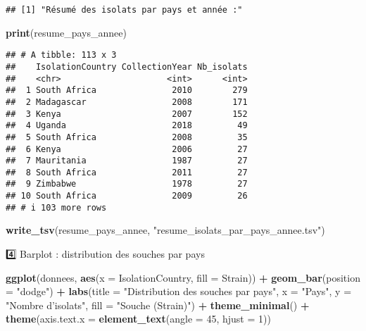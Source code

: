 \documentclass[
]{article}
\newenvironment{Shaded}{\begin{snugshade}}{\end{snugshade}}
\newcommand{\AttributeTok}[1]{\textcolor[rgb]{0.13,0.29,0.53}{#1}}
\newcommand{\DecValTok}[1]{\textcolor[rgb]{0.00,0.00,0.81}{#1}}
\newcommand{\FunctionTok}[1]{\textcolor[rgb]{0.13,0.29,0.53}{\textbf{#1}}}
\newcommand{\NormalTok}[1]{#1}
\newcommand{\SpecialCharTok}[1]{\textcolor[rgb]{0.81,0.36,0.00}{\textbf{#1}}}
\newcommand{\StringTok}[1]{\textcolor[rgb]{0.31,0.60,0.02}{#1}}
\begin{document}
\begin{verbatim}
## [1] "Résumé des isolats par pays et année :"
\end{verbatim}

\begin{Shaded}
\begin{Highlighting}[]
\FunctionTok{print}\NormalTok{(resume\_pays\_annee)}
\end{Highlighting}
\end{Shaded}

\begin{verbatim}
## # A tibble: 113 x 3
##    IsolationCountry CollectionYear Nb_isolats
##    <chr>                     <int>      <int>
##  1 South Africa               2010        279
##  2 Madagascar                 2008        171
##  3 Kenya                      2007        152
##  4 Uganda                     2018         49
##  5 South Africa               2008         35
##  6 Kenya                      2006         27
##  7 Mauritania                 1987         27
##  8 South Africa               2011         27
##  9 Zimbabwe                   1978         27
## 10 South Africa               2009         26
## # i 103 more rows
\end{verbatim}

\begin{Shaded}
\begin{Highlighting}[]
\FunctionTok{write\_tsv}\NormalTok{(resume\_pays\_annee, }\StringTok{"resume\_isolats\_par\_pays\_annee.tsv"}\NormalTok{)}
\end{Highlighting}
\end{Shaded}

4️⃣ Barplot : distribution des souches par pays

\begin{Shaded}
\begin{Highlighting}[]
\FunctionTok{ggplot}\NormalTok{(donnees, }\FunctionTok{aes}\NormalTok{(}\AttributeTok{x =}\NormalTok{ IsolationCountry, }\AttributeTok{fill =}\NormalTok{ Strain)) }\SpecialCharTok{+}
  \FunctionTok{geom\_bar}\NormalTok{(}\AttributeTok{position =} \StringTok{"dodge"}\NormalTok{) }\SpecialCharTok{+}
  \FunctionTok{labs}\NormalTok{(}\AttributeTok{title =} \StringTok{"Distribution des souches par pays"}\NormalTok{,}
       \AttributeTok{x =} \StringTok{"Pays"}\NormalTok{,}
       \AttributeTok{y =} \StringTok{"Nombre d’isolats"}\NormalTok{,}
       \AttributeTok{fill =} \StringTok{"Souche (Strain)"}\NormalTok{) }\SpecialCharTok{+}
  \FunctionTok{theme\_minimal}\NormalTok{() }\SpecialCharTok{+}
  \FunctionTok{theme}\NormalTok{(}\AttributeTok{axis.text.x =} \FunctionTok{element\_text}\NormalTok{(}\AttributeTok{angle =} \DecValTok{45}\NormalTok{, }\AttributeTok{hjust =} \DecValTok{1}\NormalTok{))}
\end{Highlighting}
\end{Shaded}
\end{document}
